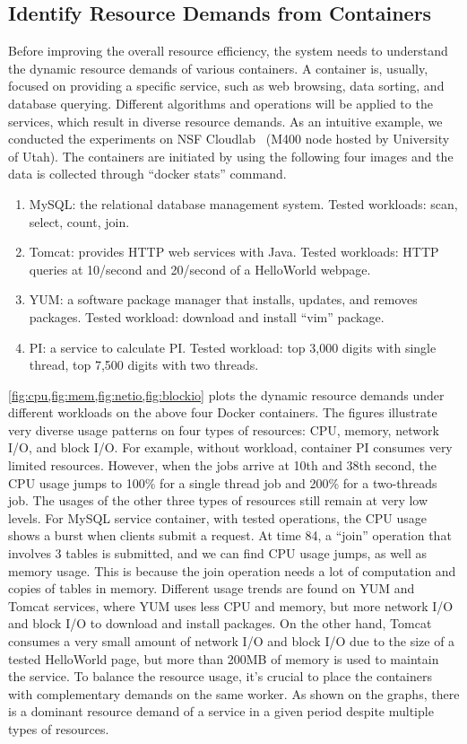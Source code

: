 \subsection{Identify Resource Demands from Containers}
\label{understand}
Before improving the overall resource efficiency, the system needs to understand the dynamic resource demands of various containers.
A container is, usually, focused on providing a specific service, such as web browsing, data sorting, and database querying.
Different algorithms and operations will be applied to the services, which result in diverse resource demands.
As an intuitive example, we conducted the experiments on NSF Cloudlab~\cite{cloudlab} (M400 node hosted by University of Utah).
The containers are initiated by using the following four images and the data is collected through ``docker stats'' command.
\begin{enumerate}
 \item MySQL: the relational database management system. Tested workloads: scan, select, count, join.
 \item Tomcat: provides HTTP web services with Java. Tested workloads: HTTP queries at 10/second and 20/second of a HelloWorld webpage.
 \item YUM: a software package manager that installs, updates, and removes packages. Tested workload: download and install ``vim'' package.
 \item PI: a service to calculate PI. Tested workload: top 3,000 digits with single thread, top 7,500 digits with two threads.
\end{enumerate}
\cref{fig:cpu,fig:mem,fig:netio,fig:blockio} plots the dynamic resource demands under different workloads on the above four Docker containers.
The figures illustrate very diverse usage patterns on four types of resources: CPU, memory, network I/O, and block I/O.
For example, without workload, container PI consumes very limited resources. However, when the jobs arrive at 10th and 38th second, the CPU usage
jumps to 100\% for a single thread job and 200\% for a two-threads job. The usages of the other three types of resources still remain at very low levels.
For MySQL service container, with tested operations, the CPU usage shows a burst when clients submit a request. At time 84, a ``join'' operation that involves
3 tables is submitted, and we can find CPU usage jumps, as well as memory usage. This is because the join operation needs a lot of computation and copies
of tables in memory. Different usage trends are found on YUM and Tomcat services, where YUM uses less CPU and memory, but more network I/O and block I/O to
download and install packages. On the other hand,
Tomcat consumes a very small amount of network I/O and block I/O due to the size of a tested HelloWorld page, but more than 200MB of memory is used to maintain the
service.
To balance the resource usage, it's crucial to place the containers with complementary demands on the same worker.
As shown on the graphs,
there is a dominant resource demand of a service in a given period despite multiple types of resources.

